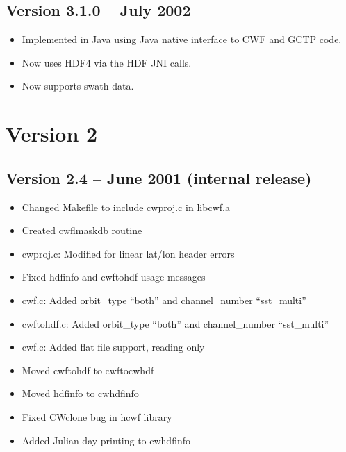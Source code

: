 
\subsection*{Version 3.1.0 -- July 2002}

\begin{itemize}

  \item Implemented in Java using Java native interface to CWF and
  GCTP code.

  \item Now uses HDF4 via the HDF JNI calls.

  \item Now supports swath data.

\end{itemize}


\section{Version 2}


\subsection*{Version 2.4 -- June 2001 (internal release)}

\begin{itemize}

  \item Changed Makefile to include cwproj.c in libcwf.a

  \item Created cwflmaskdb routine

  \item cwproj.c: Modified for linear lat/lon header errors

  \item Fixed hdfinfo and cwftohdf usage messages

  \item cwf.c: Added orbit\_type ``both'' and channel\_number
  ``sst\_multi''

  \item cwftohdf.c: Added orbit\_type ``both'' and channel\_number
  ``sst\_multi''

  \item cwf.c: Added flat file support, reading only

  \item Moved cwftohdf to cwftocwhdf

  \item Moved hdfinfo to cwhdfinfo

  \item Fixed CWclone bug in hcwf library

  \item Added Julian day printing to cwhdfinfo

\end{itemize}

